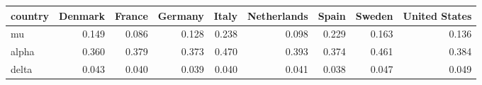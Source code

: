 \begin{tabular}{lrrrrrrrr}
\toprule
country &  Denmark &  France &  Germany &  Italy &  Netherlands &  Spain &  Sweden &  United States \\
\midrule
mu    &    0.149 &   0.086 &    0.128 &  0.238 &        0.098 &  0.229 &   0.163 &          0.136 \\
alpha &    0.360 &   0.379 &    0.373 &  0.470 &        0.393 &  0.374 &   0.461 &          0.384 \\
delta &    0.043 &   0.040 &    0.039 &  0.040 &        0.041 &  0.038 &   0.047 &          0.049 \\
\bottomrule
\end{tabular}
